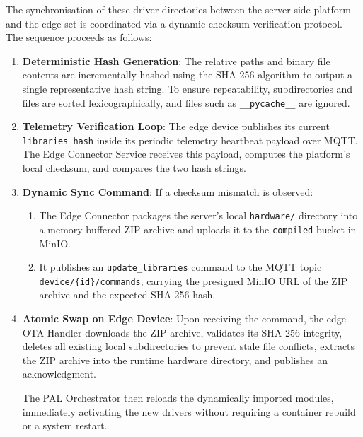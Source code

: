 The synchronisation of these driver directories between the server-side platform and the edge set is coordinated via a dynamic checksum verification protocol. The sequence proceeds as follows:

\begin{enumerate}
    \item \textbf{Deterministic Hash Generation}: The relative paths and binary file contents are incrementally hashed using the SHA-256 algorithm to output a single representative hash string. To ensure repeatability, subdirectories and files are sorted lexicographically, and files such as \texttt{\_\_pycache\_\_} are ignored.
    
    \item \textbf{Telemetry Verification Loop}: The edge device publishes its current \texttt{libraries\_hash} inside its periodic telemetry heartbeat payload over \gls{MQTT}. The Edge Connector Service receives this payload, computes the platform's local checksum, and compares the two hash strings.
    
    \item \textbf{Dynamic Sync Command}: If a checksum mismatch is observed:
    \begin{enumerate}
        \item The Edge Connector packages the server's local \texttt{hardware/} directory into a memory-buffered ZIP archive and uploads it to the \texttt{compiled} bucket in MinIO.
        \item It publishes an \texttt{update\_libraries} command to the \gls{MQTT} topic \texttt{device/\{id\}/commands}, carrying the presigned MinIO \gls{URL} of the ZIP archive and the expected SHA-256 hash.
    \end{enumerate}
    
    \item \textbf{Atomic Swap on Edge Device}: Upon receiving the command, the edge \gls{OTA} Handler downloads the ZIP archive, validates its SHA-256 integrity, deletes all existing local subdirectories to prevent stale file conflicts, extracts the ZIP archive into the runtime hardware directory, and publishes an acknowledgment. 
    
    The \gls{PAL} Orchestrator then reloads the dynamically imported modules, immediately activating the new drivers without requiring a container rebuild or a system restart.
\end{enumerate}




